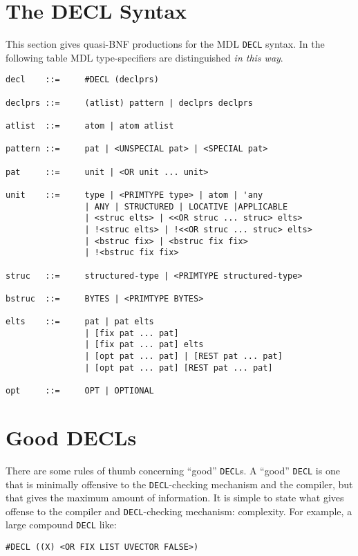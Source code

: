 \documentclass[a4paper]{scrbook}
\begin{document}
\section{The DECL Syntax}\label{the-decl-syntax}

This section gives quasi-BNF productions for the MDL \texttt{DECL} syntax. In the following table MDL type-specifiers are
distinguished \emph{in this way}.

\begin{verbatim}
decl    ::=     #DECL (declprs)

declprs ::=     (atlist) pattern | declprs declprs

atlist  ::=     atom | atom atlist

pattern ::=     pat | <UNSPECIAL pat> | <SPECIAL pat>

pat     ::=     unit | <OR unit ... unit>

unit    ::=     type | <PRIMTYPE type> | atom | 'any
                | ANY | STRUCTURED | LOCATIVE |APPLICABLE
                | <struc elts> | <<OR struc ... struc> elts>
                | !<struc elts> | !<<OR struc ... struc> elts>
                | <bstruc fix> | <bstruc fix fix>
                | !<bstruc fix fix>

struc   ::=     structured-type | <PRIMTYPE structured-type>

bstruc  ::=     BYTES | <PRIMTYPE BYTES>

elts    ::=     pat | pat elts
                | [fix pat ... pat]
                | [fix pat ... pat] elts
                | [opt pat ... pat] | [REST pat ... pat]
                | [opt pat ... pat] [REST pat ... pat]

opt     ::=     OPT | OPTIONAL
\end{verbatim}

\section{Good DECLs}\label{good-decls}

There are some rules of thumb concerning ``good'' \texttt{DECL}s. A ``good'' \texttt{DECL} is one that is minimally
offensive to the \texttt{DECL}-checking mechanism and the compiler, but that gives the maximum amount of information. It is
simple to state what gives offense to the compiler and \texttt{DECL}-checking mechanism: complexity. For example, a large
compound \texttt{DECL} like:

\begin{verbatim}
#DECL ((X) <OR FIX LIST UVECTOR FALSE>)
\end{verbatim}
\end{document}

